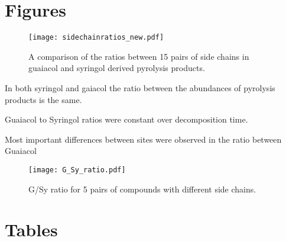 \documentclass[preprint,12pt]{elsarticle}
\begin{document}
{\section{Figures}
\begin{figure}
  \caption{A comparison of the ratios between 15 pairs of side chains in guaiacol and syringol derived pyrolysis products.}
  \centering
    \texttt{[image: sidechainratios\_new.pdf]}
  \label{sidechainratios}
\end{figure}


In both syringol and gaiacol the ratio between the abundances of pyrolysis products is the same.

Guaiacol to Syringol ratios were constant over decomposition time. 

Most important differences between sites were observed in the ratio between Guaiacol



\begin{figure}[p!]
  \caption{G/Sy ratio for 5 pairs of compounds with different side chains.}
  \centering
    \texttt{[image: G\_Sy\_ratio.pdf]}
\end{figure}

\section{Tables}

}
\end{document}
